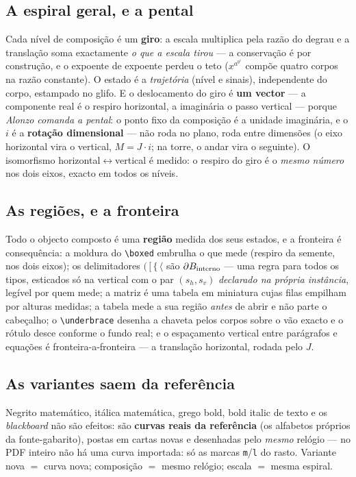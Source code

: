 \documentclass[11pt,a4paper]{article}
\newcommand{\code}[1]{\texttt{\small #1}}
\begin{document}
\subsection*{A espiral geral, e a pental}

Cada nível de composição é um \textbf{giro}: a escala multiplica pela razão do degrau e a
translação soma exactamente \emph{o que a escala tirou} --- a conservação é por construção, e o
expoente de expoente perdeu o teto ($x^{a^{b^{c}}}$ compõe quatro corpos na razão constante). O
estado é a \emph{trajetória} (nível e sinais), independente do corpo, estampado no glifo. E o
deslocamento do giro é \textbf{um vector} --- a componente real é o respiro horizontal, a
imaginária o passo vertical --- porque \emph{Alonzo comanda a pental}: o ponto fixo da composição
é a unidade imaginária, e o $i$ é a \textbf{rotação dimensional} --- não roda no plano, roda entre
dimensões (o eixo horizontal vira o vertical, $M=J\cdot i$; na torre, o andar vira o seguinte). O
isomorfismo horizontal$\leftrightarrow$vertical é medido: o respiro do giro é o \emph{mesmo
número} nos dois eixos, exacto em todos os níveis.

\subsection*{As regiões, e a fronteira}

Todo o objecto composto é uma \textbf{região} medida dos seus estados, e a fronteira é
consequência: a moldura do \code{\textbackslash boxed} embrulha o que mede (respiro da semente,
nos dois eixos); os delimitadores $(\,[\,\{\,\langle$ são $\partial B_{\rm interno}$ --- uma
regra para todos os tipos, esticados só na vertical com o par $(s_h,s_v)$ \emph{declarado na
própria instância}, legível por quem mede; a matriz é uma tabela em miniatura cujas filas empilham
por alturas medidas; a tabela mede a sua região \emph{antes} de abrir e não parte o cabeçalho; o
\code{\textbackslash underbrace} desenha a chaveta pelos corpos sobre o vão exacto e o rótulo
desce conforme o fundo real; e o espaçamento vertical entre parágrafos e equações é
fronteira-a-fronteira --- a translação horizontal, rodada pelo $J$.

\subsection*{As variantes saem da referência}

Negrito matemático, itálica matemática, grego bold, bold italic de texto e os \emph{blackboard}
não são efeitos: são \textbf{curvas reais da referência} (os alfabetos próprios da fonte-gabarito),
postas em cartas novas e desenhadas pelo \emph{mesmo} relógio --- no PDF inteiro não há uma curva
importada: só as marcas \code{m}/\code{l} do rasto. Variante nova $=$ curva nova; composição $=$
mesmo relógio; escala $=$ mesma espiral.
\end{document}

